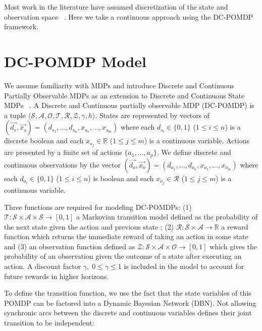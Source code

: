 \documentclass{article} %
\begin{document}
Most work in the literature have assumed discretization of the state and observation space ~\cite{steam2}. Here we take a continuous approach using the DC-POMDP framework.

\section{DC-POMDP Model} 
We assume familiarity with MDPs and introduce Discrete and Continuous Partially Observable MDPs as an extension to Discrete and Continuous State MDPs ~\cite{sanner_uai11}. A Discrete and Continuous partially observable MDP (DC-POMDP) is a tuple $\langle
\mathcal{S},\mathcal{A},\mathcal{O},\mathcal{T},\mathcal{R},\mathcal{Z},\gamma,h \rangle$. 
States are represented by vectors of $(\vec{d_s},\vec{x_s}) = ( d_{s_1},\ldots,d_{s_n},x_{s_1},\ldots,x_{s_m} )$ where each $d_{s_i} \in \{ 0,1 \}$ ($1 \leq i \leq n$) is a discrete boolean and each $x_{s_j} \in  \mathbb{R}$ ($1 \leq j \leq m$) is a continuous variable. Actions are presented by a finite set of actions $\{ a_1, \ldots, a_p \}$. We define discrete and continuous observations by the vector $(\vec{d_o},\vec{x_o}) = ( d_{o_1},\ldots,d_{o_n},x_{o_1},\ldots,x_{o_m} )$ where each $d_{o_i} \in \{ 0,1 \}$ ($1 \leq i \leq n$) is boolean and each $x_{o_j} \in \mathcal{R}$ ($1 \leq j \leq m$) is a continuous variable. 

Three functions are required for modeling DC-POMDPs: (1) $\mathcal{T}: \mathcal{S} \times \mathcal{A} \times \mathcal{S} \rightarrow  [ 0, 1 ]$ a Markovian transition model defined as the probability of the next state given the action and previous state%
; (2)  $\mathcal{R}:\mathcal{S}\times\mathcal{A} \rightarrow \mathbb{R}$ a reward function which returns the immediate reward of taking an action in some state and (3) an observation function defined as $\mathcal{Z} : \mathcal{S} \times \mathcal{A} \times \mathcal{O} \rightarrow [ 0, 1 ]$  which gives the probability of an observation given the outcome of a state after executing an action.  A discount factor $\gamma, \; 0 \leq \gamma \leq 1$ is included in the model to account for future rewards in higher horizons.

To define the transition function, we use the fact that the state variables of this POMDP can be factored into a Dynamic Bayesian Network (DBN). Not allowing synchronic arcs between the discrete and continuous variables defines their joint transition to be independent: 
\end{document}
